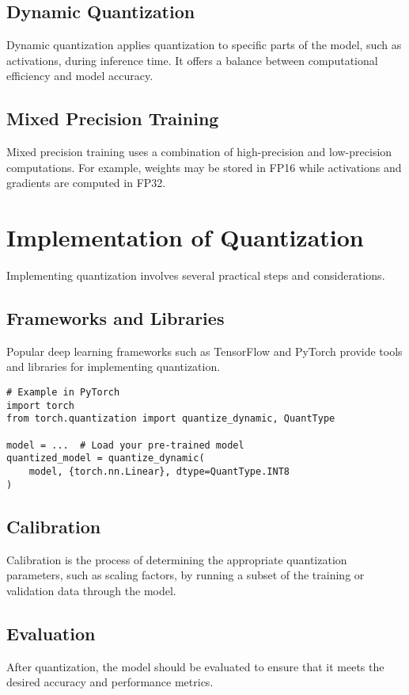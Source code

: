\subsection{Dynamic Quantization}
Dynamic quantization applies quantization to specific parts of the model, such as activations, during inference time. It offers a balance between computational efficiency and model accuracy.

\subsection{Mixed Precision Training}
Mixed precision training uses a combination of high-precision and low-precision computations. For example, weights may be stored in FP16 while activations and gradients are computed in FP32.

\section{Implementation of Quantization}
Implementing quantization involves several practical steps and considerations.

\subsection{Frameworks and Libraries}
Popular deep learning frameworks such as TensorFlow and PyTorch provide tools and libraries for implementing quantization.

\begin{verbatim}
# Example in PyTorch
import torch
from torch.quantization import quantize_dynamic, QuantType

model = ...  # Load your pre-trained model
quantized_model = quantize_dynamic(
    model, {torch.nn.Linear}, dtype=QuantType.INT8
)
\end{verbatim}

\subsection{Calibration}
Calibration is the process of determining the appropriate quantization parameters, such as scaling factors, by running a subset of the training or validation data through the model.

\subsection{Evaluation}
After quantization, the model should be evaluated to ensure that it meets the desired accuracy and performance metrics.

